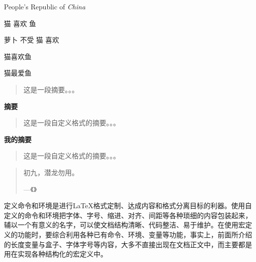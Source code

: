\documentclass{ctexart}  %
\newcommand\PRC{People's Republic of \emph{China}}
\newcommand\love[2]{#1 喜欢 #2}
\newcommand{\hateby}[2]{#2 不受 #1 喜欢}
\newcommand{\loves}[3][喜欢]{#2#1#3}
\renewcommand{\abstractname}{简介} %
\newenvironment{myabstract}[1][摘要]
{\small 
	\begin{center} \bfseries #1 \end{center}
	\begin{quotation}}
	{\end{quotation}}
\newenvironment{Quotation}[1]
{\newcommand{\quotesource}{#1}
	\begin{quotation}}
	{\par\hfill---《\textit{\quotesource}》
\end{quotation}}
\begin{document}
	\PRC
	
	\love{猫}{鱼}
	
	\hateby{猫}{萝卜}
	
	\loves{猫}{鱼} %
	
	\loves[最爱]{猫}{鱼} %
	
	\begin{abstract}%
		这是一段摘要。。。
	\end{abstract}
	
	\begin{myabstract} %
		这是一段自定义格式的摘要。。。
	\end{myabstract}
	
	\begin{myabstract}[我的摘要] %
		这是一段自定义格式的摘要。。。
	\end{myabstract}
	
	\begin{Quotation}{易$\cdot$乾}
		初九，潜龙勿用。
	\end{Quotation}
	
	定义命令和环境是进行\LaTeX{}格式定制、达成内容和格式分离目标的利器。使用自定义的命令和环境把字体、字号、缩进、对齐、间距等各种琐细的内容包装起来，辅以一个有意义的名字，可以使文档结构清晰、代码整洁、易于维护。在使用宏定义的功能时，要综合利用各种已有命令、环境、变量等功能，事实上，前面所介绍的长度变量与盒子、字体字号等内容，大多不直接出现在文档正文中，而主要都是用在实现各种结构化的宏定义中。
	
\end{document}
